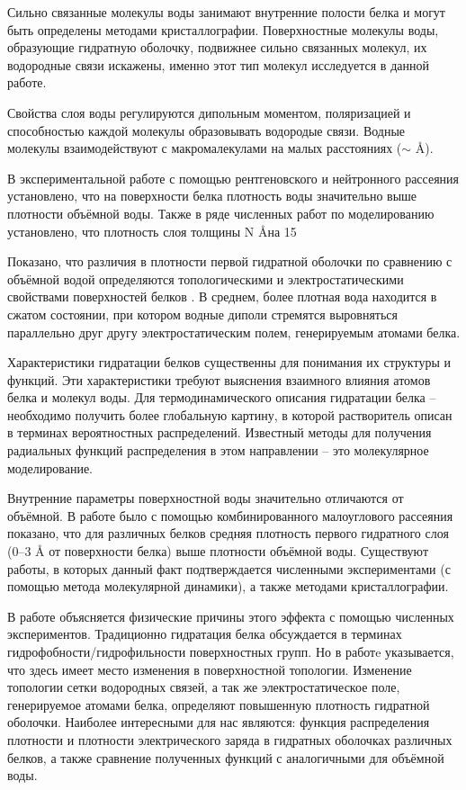 \documentclass[a4paper]{article}
\begin{document}
Сильно связанные молекулы воды занимают внутренние полости белка и могут быть определены методами кристаллографии.  Поверхностные молекулы воды, образующие гидратную оболочку, подвижнее сильно связанных молекул, их водородные связи искажены, именно этот тип молекул исследуется в данной работе. 

Свойства слоя воды регулируются дипольным моментом, поляризацией и способностью каждой молекулы образовывать водородые связи. Водные молекулы взаимодействуют с макромалекулами на малых 
расстояниях ($\sim$ \AA). 

В экспериментальной работе \cite{Burling} с помощью рентгеновского и нейтронного рассеяния установлено, что на поверхности белка плотность воды значительно выше плотности объёмной воды. Также в ряде численных работ по моделированию установлено, что плотность слоя толщины N \AA на 15%

Показано, что различия в плотности первой гидратной оболочки по сравнению с объёмной водой определяются топологическими и электростатическими свойствами поверхностей белков \cite{Mattos}. В среднем, более плотная вода находится в сжатом состоянии, при котором водные диполи стремятся выровняться параллельно друг другу электростатическим полем, генерируемым атомами белка.

Характеристики гидратации белков существенны для понимания их структуры и функций. Эти характеристики требуют выяснения взаимного влияния атомов белка и молекул воды. Для термодинамического описания гидратации белка – необходимо получить более глобальную картину, в которой растворитель описан в терминах вероятностных распределений. Известный методы для получения радиальных функций распределения в этом направлении – это молекулярное моделирование.

Внутренние параметры поверхностной воды значительно отличаются от объёмной. В работе \cite{Svergun} было с помощью комбинированного малоуглового рассеяния показано, что для различных белков средняя плотность первого гидратного слоя (0–3 Å от поверхности белка) выше плотности объёмной воды. Существуют работы, в которых данный факт подтверждается численными экспериментами (с помощью метода молекулярной динамики), а также методами кристаллографии.

В работе \cite{Levitt} объясняется физические причины этого эффекта с помощью численных экспериментов. Традиционно гидратация белка обсуждается в терминах  гидрофобности/гидрофильности поверхностных групп. Но в работe \cite{Cheng} указывается, что здесь имеет место изменения в поверхностной топологии. Изменение топологии сетки водородных связей, а так же электростатическое поле, генерируемое атомами белка, определяют повышенную плотность гидратной оболочки. Наиболее интересными для нас являются: функция распределения плотности и плотности электрического заряда в гидратных оболочках различных белков, а также сравнение полученных функций с аналогичными для объёмной воды.
\end{document}
